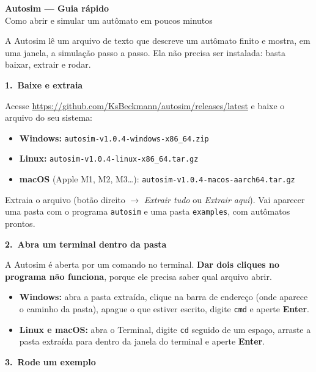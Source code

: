 \documentclass[11pt,a4paper]{article}
\newcommand{\passo}[2]{%
  \par\medskip
  {\large\bfseries\color{acento}#1.\ #2}\par\smallskip
}
\begin{document}
\begin{center}
  {\LARGE\bfseries Autosim — Guia rápido}\\[4pt]
  Como abrir e simular um autômato em poucos minutos
\end{center}

A Autosim lê um arquivo de texto que descreve um autômato finito e mostra, em uma janela,
a simulação passo a passo. Ela não precisa ser instalada: basta baixar, extrair e rodar.

\passo{1}{Baixe e extraia}

Acesse \url{https://github.com/KsBeckmann/autosim/releases/latest} e baixe o arquivo do seu
sistema:

\begin{itemize}
  \item \textbf{Windows:} \texttt{autosim-v1.0.4-windows-x86\_64.zip}
  \item \textbf{Linux:} \texttt{autosim-v1.0.4-linux-x86\_64.tar.gz}
  \item \textbf{macOS} (Apple M1, M2, M3\ldots): \texttt{autosim-v1.0.4-macos-aarch64.tar.gz}
\end{itemize}

Extraia o arquivo (botão direito $\rightarrow$ \emph{Extrair tudo} ou \emph{Extrair aqui}).
Vai aparecer uma pasta com o programa \texttt{autosim} e uma pasta \texttt{examples}, com
autômatos prontos.

\passo{2}{Abra um terminal dentro da pasta}

A Autosim é aberta por um comando no terminal. \textbf{Dar dois cliques no programa não
funciona}, porque ele precisa saber qual arquivo abrir.

\begin{itemize}
  \item \textbf{Windows:} abra a pasta extraída, clique na barra de endereço (onde aparece o
  caminho da pasta), apague o que estiver escrito, digite \texttt{cmd} e aperte
  \textbf{Enter}.
  \item \textbf{Linux e macOS:} abra o Terminal, digite \texttt{cd} seguido de um espaço,
  arraste a pasta extraída para dentro da janela do terminal e aperte \textbf{Enter}.
\end{itemize}

\passo{3}{Rode um exemplo}
\end{document}
